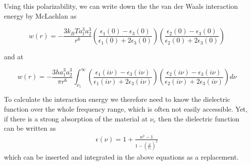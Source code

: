 \documentclass[letterpaper,10pt,english]{sphinxmanual}
\begin{document}
\sphinxAtStartPar
Using this polarizability, we can write down the the van der Waals interaction energy by McLachlan as

\sphinxAtStartPar
{}

\sphinxAtStartPar
\begin{equation}
w(r)=-\frac{3k_B T a_{1}^3a_2^3}{r^6}\left ( \frac{\epsilon_1(0)-\epsilon_3(0)}{\epsilon_1(0)+2\epsilon_3(0)}\right )\left ( \frac{\epsilon_2(0)-\epsilon_3(0)}{\epsilon_2(0)+2\epsilon_3(0)}\right )
\end{equation}

\sphinxAtStartPar
and at

\sphinxAtStartPar
{}

\sphinxAtStartPar
\begin{equation}
w(r)=-\frac{3h a_{1}^3a_2^3}{\pi r^6}\int_{\nu_1}^\infty\left ( \frac{\epsilon_1(i\nu)-\epsilon_3(i\nu)}{\epsilon_1(i\nu)+2\epsilon_3(i\nu)}\right )\left ( \frac{\epsilon_2(i\nu)-\epsilon_3(i\nu)}{\epsilon_2(i\nu)+2\epsilon_3(i\nu)}\right )d\nu
\end{equation}

\sphinxAtStartPar
To calculate the interaction energy we therefore need to know the dielectric function over the whole frequency range, which is often not easily accessible. Yet, if there is a strong absorption of the material at \(\nu_e\) then the dielectric function can be written as
\begin{equation*}
\begin{split}\epsilon(\nu)=1+\frac{n^2-1}{1-\left (\frac{\nu}{\nu_e}\right )^2}\end{split}
\end{equation*}
\sphinxAtStartPar
which can be inserted and integrated in the above equations as a replacement.
\end{document}
